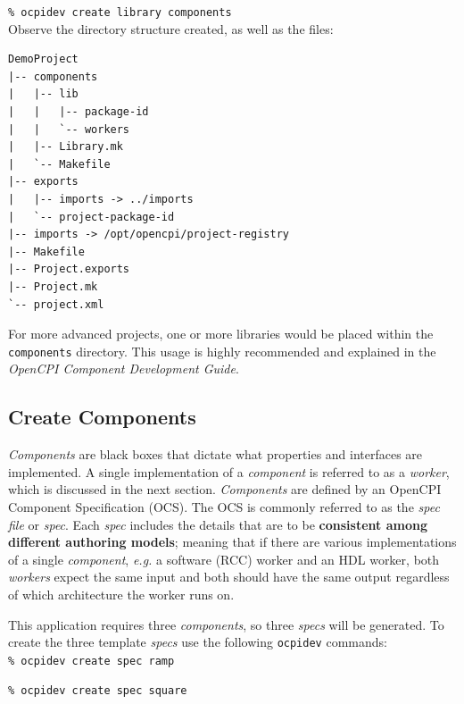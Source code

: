 \forceindent\verb+% ocpidev create library components+\\

\bstart
Observe the directory structure created, as well as the files:
\begin{verbatim}
DemoProject
|-- components
|   |-- lib
|   |   |-- package-id
|   |   `-- workers
|   |-- Library.mk
|   `-- Makefile
|-- exports
|   |-- imports -> ../imports
|   `-- project-package-id
|-- imports -> /opt/opencpi/project-registry
|-- Makefile
|-- Project.exports
|-- Project.mk
`-- project.xml

\end{verbatim}
\bend
For more advanced projects, one or more libraries would be placed within the \verb+components+ directory. This usage is highly recommended and explained in the \textit{OpenCPI Component Development Guide}.

\subsection{Create Components}
\textit{Components} are black boxes that dictate what properties and interfaces are implemented. A single implementation of a \textit{component} is referred to as a \textit{worker}, which is discussed in the next section. \textit{Components} are defined by an OpenCPI Component Specification (OCS). The OCS is commonly referred to as the \textit{spec file} or \textit{spec}. Each \textit{spec} includes the details that are to be \textbf{consistent among different authoring models}; meaning that if there are various implementations of a single \textit{component}, \textit{e.g.} a software (RCC) worker and an HDL worker, both \textit{workers} expect the same input and both should have the same output regardless of which architecture the worker runs on.\newline

This application requires three \textit{components}, so three \textit{specs} will be generated. To create the three template \textit{specs} use the following \verb+ocpidev+ commands:\\

\forceindent\verb+% ocpidev create spec ramp+

\forceindent\verb+% ocpidev create spec square+

